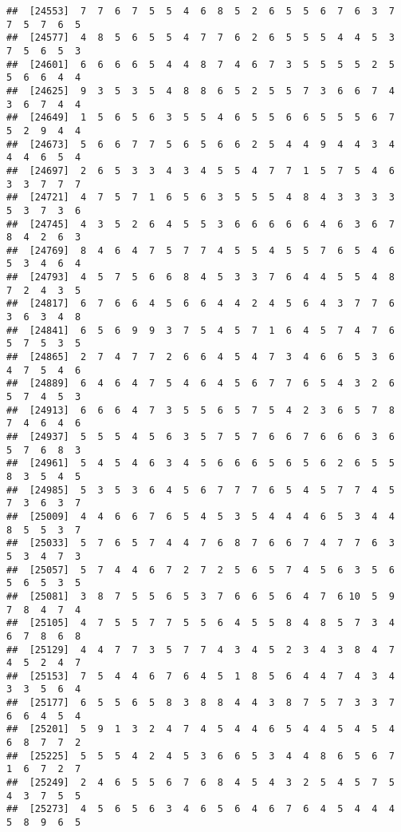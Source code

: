 \documentclass[
]{book}
\begin{document}
\begin{verbatim}
##  [24553]  7  7  6  7  5  5  4  6  8  5  2  6  5  5  6  7  6  3  7  7  5  7  6  5
##  [24577]  4  8  5  6  5  5  4  7  7  6  2  6  5  5  5  4  4  5  3  7  5  6  5  3
##  [24601]  6  6  6  6  5  4  4  8  7  4  6  7  3  5  5  5  5  2  5  5  6  6  4  4
##  [24625]  9  3  5  3  5  4  8  8  6  5  2  5  5  7  3  6  6  7  4  3  6  7  4  4
##  [24649]  1  5  6  5  6  3  5  5  4  6  5  5  6  6  5  5  5  6  7  5  2  9  4  4
##  [24673]  5  6  6  7  7  5  6  5  6  6  2  5  4  4  9  4  4  3  4  4  4  6  5  4
##  [24697]  2  6  5  3  3  4  3  4  5  5  4  7  7  1  5  7  5  4  6  3  3  7  7  7
##  [24721]  4  7  5  7  1  6  5  6  3  5  5  5  4  8  4  3  3  3  3  5  3  7  3  6
##  [24745]  4  3  5  2  6  4  5  5  3  6  6  6  6  6  4  6  3  6  7  8  4  2  6  3
##  [24769]  8  4  6  4  7  5  7  7  4  5  5  4  5  5  7  6  5  4  6  5  3  4  6  4
##  [24793]  4  5  7  5  6  6  8  4  5  3  3  7  6  4  4  5  5  4  8  7  2  4  3  5
##  [24817]  6  7  6  6  4  5  6  6  4  4  2  4  5  6  4  3  7  7  6  3  6  3  4  8
##  [24841]  6  5  6  9  9  3  7  5  4  5  7  1  6  4  5  7  4  7  6  5  7  5  3  5
##  [24865]  2  7  4  7  7  2  6  6  4  5  4  7  3  4  6  6  5  3  6  4  7  5  4  6
##  [24889]  6  4  6  4  7  5  4  6  4  5  6  7  7  6  5  4  3  2  6  5  7  4  5  3
##  [24913]  6  6  6  4  7  3  5  5  6  5  7  5  4  2  3  6  5  7  8  7  4  6  4  6
##  [24937]  5  5  5  4  5  6  3  5  7  5  7  6  6  7  6  6  6  3  6  5  7  6  8  3
##  [24961]  5  4  5  4  6  3  4  5  6  6  6  5  6  5  6  2  6  5  5  8  3  5  4  5
##  [24985]  5  3  5  3  6  4  5  6  7  7  7  6  5  4  5  7  7  4  5  7  3  6  3  7
##  [25009]  4  4  6  6  7  6  5  4  5  3  5  4  4  4  6  5  3  4  4  8  5  5  3  7
##  [25033]  5  7  6  5  7  4  4  7  6  8  7  6  6  7  4  7  7  6  3  5  3  4  7  3
##  [25057]  5  7  4  4  6  7  2  7  2  5  6  5  7  4  5  6  3  5  6  5  6  5  3  5
##  [25081]  3  8  7  5  5  6  5  3  7  6  6  5  6  4  7  6 10  5  9  7  8  4  7  4
##  [25105]  4  7  5  5  7  7  5  5  6  4  5  5  8  4  8  5  7  3  4  6  7  8  6  8
##  [25129]  4  4  7  7  3  5  7  7  4  3  4  5  2  3  4  3  8  4  7  4  5  2  4  7
##  [25153]  7  5  4  4  6  7  6  4  5  1  8  5  6  4  4  7  4  3  4  3  3  5  6  4
##  [25177]  6  5  5  6  5  8  3  8  8  4  4  3  8  7  5  7  3  3  7  6  6  4  5  4
##  [25201]  5  9  1  3  2  4  7  4  5  4  4  6  5  4  4  5  4  5  4  6  8  7  7  2
##  [25225]  5  5  5  4  2  4  5  3  6  6  5  3  4  4  8  6  5  6  7  1  6  7  2  7
##  [25249]  2  4  6  5  5  6  7  6  8  4  5  4  3  2  5  4  5  7  5  4  3  7  5  5
##  [25273]  4  5  6  5  6  3  4  6  5  6  4  6  7  6  4  5  4  4  4  5  8  9  6  5

\end{verbatim}
\end{document}
